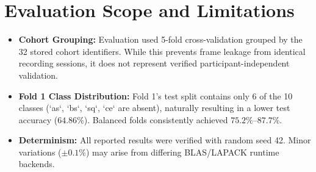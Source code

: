 \section{Evaluation Scope and Limitations}

\begin{itemize}
    \item \textbf{Cohort Grouping:} Evaluation used 5-fold cross-validation grouped by the 32 stored cohort identifiers. While this prevents frame leakage from identical recording sessions, it does not represent verified participant-independent validation.
    \item \textbf{Fold 1 Class Distribution:} Fold 1’s test split contains only 6 of the 10 classes (`as`, `bs`, `sq`, `ce` are absent), naturally resulting in a lower test accuracy ($64.86\%$). Balanced folds consistently achieved $75.2\%\text{--}87.7\%$.
    \item \textbf{Determinism:} All reported results were verified with random seed 42. Minor variations ($\pm 0.1\%$) may arise from differing BLAS/LAPACK runtime backends.
\end{itemize}
